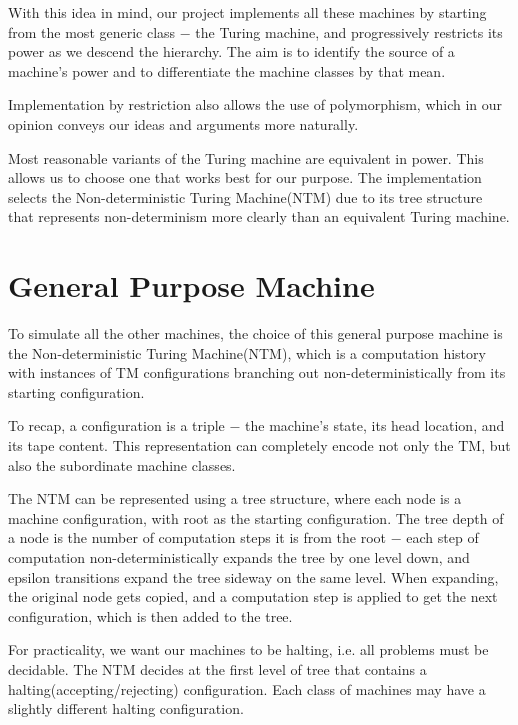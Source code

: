 \documentclass[12pt]{article}  %
\begin{document}
With this idea in mind, our project implements all these machines by starting from the most generic class $-$ the Turing machine, and progressively restricts its power as we descend the hierarchy. The aim is to identify the source of a machine's power and to differentiate the machine classes by that mean.

Implementation by restriction also allows the use of polymorphism, which in our opinion conveys our ideas and arguments more naturally.

Most reasonable variants of the Turing machine are equivalent in power. This allows us to choose one that works best for our purpose. The implementation selects the Non-deterministic Turing Machine(NTM) due to its tree structure that represents non-determinism more clearly than an equivalent Turing machine.







\section{General Purpose Machine} \label{NTM}

To simulate all the other machines, the choice of this general purpose machine is the Non-deterministic Turing Machine(NTM), which is a computation history with instances of TM configurations branching out non-deterministically from its starting configuration. 

To recap, a configuration is a triple $-$ the machine's state, its head location, and its tape content. This representation can completely encode not only the TM, but also the subordinate machine classes.

The NTM can be represented using a tree structure, where each node is a machine configuration, with root as the starting configuration. The tree depth of a node is the number of computation steps it is from the root $-$ each step of computation non-deterministically expands the tree by one level down, and epsilon transitions expand the tree sideway on the same level. When expanding, the original node gets copied, and a computation step is applied to get the next configuration, which is then added to the tree.

For practicality, we want our machines to be halting, i.e. all problems must be decidable. The NTM decides at the first level of tree that contains a halting(accepting/rejecting) configuration. Each class of machines may have a slightly different halting configuration.
\end{document}
